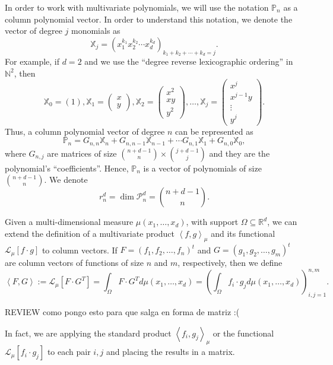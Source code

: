 \documentclass[12pt,a4]{report}
\theoremstyle{plain}
\newcommand{\R}[0]{\mathbb{R}}
\newcommand{\N}[0]{\mathbb{N}}
\newcommand{\cred}[1]{{\color{red} #1}}
\newcommand{\prodesc}[2]{\left\langle #1 , #2 \right\rangle}
\begin{document}
In order to work with multivariate polynomials, we will use the notation $\mathbb P_n$ as a column polynomial vector. In order to understand this notation, we denote the vector of degree $j$ monomials as
$$
\mathbb{X}_j = \left(x_1^{k_1} x_2^{k_2} \cdots x_d^{k_d}\right)_{k_1+k_2+\cdots +k_d = j}.
$$
For example, if $d=2$ and we use the ``degree reverse lexicographic ordering'' in $\N^2$, then
$$
\mathbb{X}_0=\left(1\right), \mathbb{X}_1=\begin{pmatrix}
    x \\ y
\end{pmatrix}, \mathbb{X}_2=\begin{pmatrix}
    x^2 \\ xy \\ y^2
\end{pmatrix}, \dots, \mathbb{X}_j=\begin{pmatrix}
    x^j \\ x^{j-1}y \\ \vdots \\ y^j
\end{pmatrix}.
$$
Thus, a column polynomial vector of degree $n$ can be represented as
$$
\mathbb{P}_n = G_{n,n}\mathbb{X}_n + G_{n,n-1}\mathbb{X}_{n-1}+\cdots G_{n,1}\mathbb{X}_1 + G_{n,0}\mathbb X_0,
$$
where $G_{n,j}$ are matrices of size $\binom{n+d-1}{n}\times\binom{j+d-1}{j}$ and they are the polynomial's ``coefficients''. Hence, $\mathbb P_n$ is a vector of polynomials of size $\binom{n+d-1}{n}$. We denote 
$$
r_n^d = \dim \mathcal{P}_n^d = \binom{n+d-1}{n}.
$$

Given a multi-dimensional measure $\mu(x_1,\dots,x_d)$, with support $\Omega\subseteq\R^d$, we can extend the definition of a multivariate product $\prodesc{f}{g}_\mu$ and its functional $\mathcal{L}_\mu[f\cdot g]$ to column vectors. If $F=(f_1,f_2,\dots,f_n)^t$ and $G=(g_1,g_2,\dots, g_m)^t$ are column vectors of functions of size $n$ and $m$, respectively, then we define
\begin{equation}
    \label{eq:prodesc-matrix}
    \prodesc{F}{G}:=\mathcal{L}_\mu[F\cdot G^T] = \int_\Omega F\cdot G^T d\mu(x_1,\dots,x_d) = \left(\int_\Omega f_i\cdot g_j d\mu(x_1,\dots,x_d)\right)_{i,j=1}^{n,m}.
\end{equation}

\cred{REVIEW como pongo esto para que salga en forma de matriz :(}

In fact, we are applying the standard product $\prodesc{f_i}{g_j}_\mu$ or the functional $\mathcal L_\mu[f_i\cdot g_j]$ to each pair $i,j$ and placing the results in a matrix.
\end{document}
